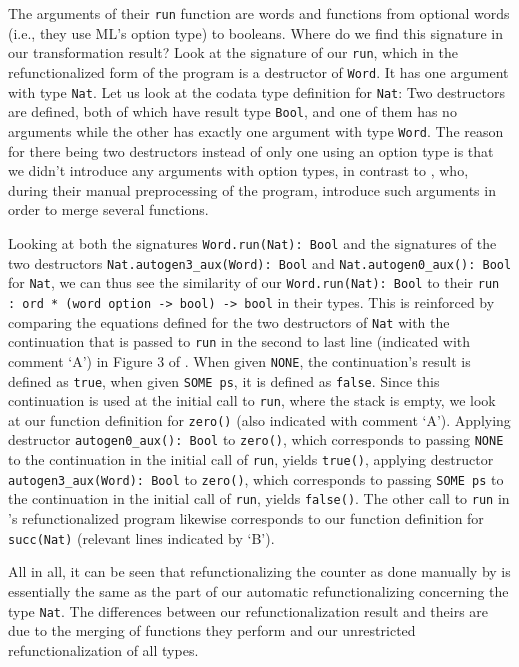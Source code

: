 The arguments of their \texttt{run} function are words and functions from optional words  (i.e., they use ML's option type) to booleans. Where do we find this signature in our transformation result? Look at the signature of our \texttt{run}, which in the refunctionalized form of the program is a destructor of \texttt{Word}. It has one argument with type \texttt{Nat}. Let us look at the codata type definition for \texttt{Nat}: Two destructors are defined, both of which have result type \texttt{Bool}, and one of them has no arguments while the other has exactly one argument with type \texttt{Word}. The reason for there being two destructors instead of only one using an option type is that we didn't introduce any arguments with option types, in contrast to \citeauthor{danvy09refunctionalization}, who, during their manual preprocessing of the program, introduce such arguments in order to merge several functions.

Looking at both the signatures \texttt{Word.run(Nat): Bool} and the signatures of the two destructors \texttt{Nat.autogen3\_aux(Word): Bool} and \texttt{Nat.autogen0\_aux(): Bool} for \texttt{Nat}, we can thus see the similarity of our \texttt{Word.run(Nat): Bool} to their \texttt{run : ord * (word option -> bool) -> bool} in their types. This is reinforced by comparing the equations defined for the two destructors of \texttt{Nat} with the continuation that is passed to \texttt{run} in the second to last line (indicated with comment `A') in Figure 3 of \citet{danvy09refunctionalization}. When given \texttt{NONE}, the continuation's result is defined as \texttt{true}, when given \texttt{SOME ps}, it is defined as \texttt{false}. Since this continuation is used at the initial call to \texttt{run}, where the stack is empty, we look at our function definition for \texttt{zero()} (also indicated with comment `A'). Applying destructor \texttt{autogen0\_aux(): Bool} to \texttt{zero()}, which corresponds to passing \texttt{NONE} to the continuation in the initial call of \texttt{run}, yields \texttt{true()}, applying destructor \texttt{autogen3\_aux(Word): Bool} to \texttt{zero()}, which corresponds to passing \texttt{SOME ps} to the continuation in the initial call of \texttt{run}, yields \texttt{false()}. The other call to \texttt{run} in \citeauthor{danvy09refunctionalization}'s refunctionalized program likewise corresponds to our function definition for \texttt{succ(Nat)} (relevant lines indicated by `B').

All in all, it can be seen that refunctionalizing the counter as done manually by \citeauthor{danvy09refunctionalization} is essentially the same as the part of our automatic refunctionalizing concerning the type \texttt{Nat}. The differences between our refunctionalization result and theirs are due to the merging of functions they perform and our unrestricted refunctionalization of all types.
